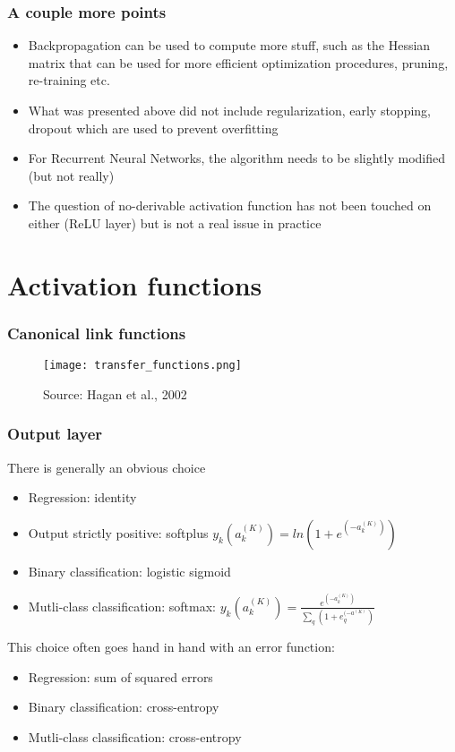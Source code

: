 \documentclass{beamer}
\begin{document}
\begin{frame}
	\frametitle{A couple more points}
    \begin{itemize}
    	\item Backpropagation can be used to compute more stuff, such as the Hessian matrix that can be used for more efficient optimization procedures, pruning, re-training etc.
        \item What was presented above did not include regularization, early stopping, dropout which are used to prevent overfitting
        \item For Recurrent Neural Networks, the algorithm needs to be slightly modified (but not really)
        \item The question of no-derivable activation function has not been touched on either (ReLU layer) but is not a real issue in practice
  \end{itemize}
\end{frame}

\section{Activation functions}
\begin{frame}
	\frametitle{Canonical link functions}
	\begin{figure}
		\texttt{[image: transfer\_functions.png]}
		\caption{Source: Hagan et al., 2002}
	\end{figure}
\end{frame}

\begin{frame}
	\frametitle{Output layer}
    There is generally an obvious choice
	\begin{itemize}
    	\item Regression: identity
        \item Output strictly positive: softplus $y_k(a^{(K)}_k) = ln(1+ e^{(-a^{(K)}_k)})$
        \item Binary classification: logistic sigmoid
        \item Mutli-class classification: softmax: $y_k(a^{(K)}_k) = \frac{e^{(-a^{(K)}_k)}}{\sum_q(1+e^{(-a^{(K)}}_q)}$
    \end{itemize} 
    This choice often goes hand in hand with an error function:
    \begin{itemize}
    	\item Regression: sum of squared errors
        \item Binary classification: cross-entropy
        \item Mutli-class classification: cross-entropy
    \end{itemize} 
\end{frame}
\end{document}
